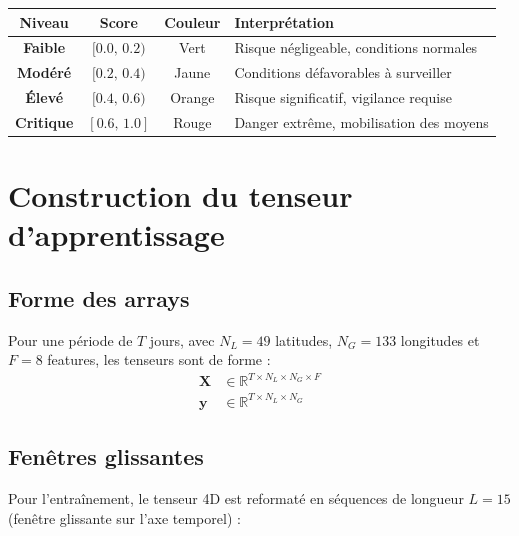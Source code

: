 \documentclass[12pt,a4paper]{report}
\begin{document}
\begin{center}
\begin{tabular}{cccl}
\toprule
\rowcolor{fireOrange!15}
\textbf{Niveau} & \textbf{Score} & \textbf{Couleur} & \textbf{Interprétation} \\
\midrule
\textcolor{riskGreen}{\textbf{Faible}}   & $[0.0,\, 0.2)$ & \cellcolor{riskGreen!20}Vert   & Risque négligeable, conditions normales \\
\textcolor{riskYellow}{\textbf{Modéré}}  & $[0.2,\, 0.4)$ & \cellcolor{riskYellow!30}Jaune & Conditions défavorables à surveiller \\
\textcolor{riskOrange}{\textbf{Élevé}}   & $[0.4,\, 0.6)$ & \cellcolor{riskOrange!20}Orange & Risque significatif, vigilance requise \\
\textcolor{riskRed}{\textbf{Critique}}   & $[0.6,\, 1.0]$ & \cellcolor{riskRed!20}Rouge   & Danger extrême, mobilisation des moyens \\
\bottomrule
\end{tabular}
\end{center}

\section{Construction du tenseur d'apprentissage}

\subsection{Forme des arrays}

Pour une période de $T$ jours, avec $N_L = 49$ latitudes, $N_G = 133$ longitudes et
$F = 8$ features, les tenseurs sont de forme :
\begin{align*}
  \mathbf{X} &\in \mathbb{R}^{T \times N_L \times N_G \times F} \\
  \mathbf{y} &\in \mathbb{R}^{T \times N_L \times N_G}
\end{align*}

\subsection{Fenêtres glissantes}

Pour l'entraînement, le tenseur 4D est reformaté en séquences de longueur $L = 15$
(fenêtre glissante sur l'axe temporel) :
\end{document}
